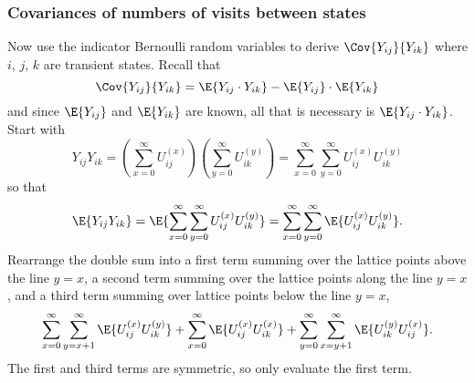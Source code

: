 \documentclass[12pt]{article}
\begin{document}
\subsubsection*{Covariances of numbers of visits between states }

Now use the indicator Bernoulli random variables to derive \( \Cov{ Y_{ij}
}{ Y_{ik} } \) where \( i \), \( j \), \( k \) are transient states.
Recall that
\[
    \Cov{ Y_{ij} }{ Y_{ik} } = \E{Y_{ij} \cdot Y_{ik}} - \E{Y_{ij}}
    \cdot \E{Y_{ik}}
\] and since \( \E{Y_{ij}} \) and \( \E{Y_{ik}} \) are known, all that
is necessary is \( \E{Y_{ij} \cdot Y_{ik}} \).  Start with
\[
    Y_{ij} Y_{ik} = \left( \sum\limits_{x=0}^{\infty} U_{ij}^{(x)}
    \right) \left( \sum\limits_{y=0}^{\infty} U_{ik}^{(y)} \right) =
    \sum\limits_{x=0}^{\infty} \sum\limits_{y=0}^{\infty} U_{ij}^{(x)} U_
    {ik}^{(y)}
\] so that
\[
    \E{Y_{ij} Y_{ik}} = \E{\sum\limits_{x=0}^{\infty} \sum\limits_{y=0}^
    {\infty} U_{ij}^{(x)} U_{ik}^{(y)}} = \sum\limits_{x=0}^{\infty}
    \sum\limits_{y=0}^{\infty} \E{U_{ij}^{(x)} U_{ik}^{(y)}}.
\] Rearrange the double sum into a first term summing over the lattice
points above the line \( y=x \), a second term summing over the lattice
points along the line \( y=x \), and a third term summing over lattice
points below the line \( y=x \),
\[
    \sum\limits_{x=0}^{\infty} \sum\limits_{y=x+1}^{\infty} \E{U_{ij}^{(x)}
    U_{ik}^{(y)}} + \sum\limits_{x=0}^{\infty} \E{U_{ij}^{(x)} U_{ik}^{(x)}}
    + \sum\limits_{y=0}^{\infty} \sum\limits_{x=y+1}^{\infty} \E{U_{ik}^
    {(y)} U_{ij}^{(x)}}.
\] The first and third terms are symmetric, so only evaluate the first
term.
\end{document}
